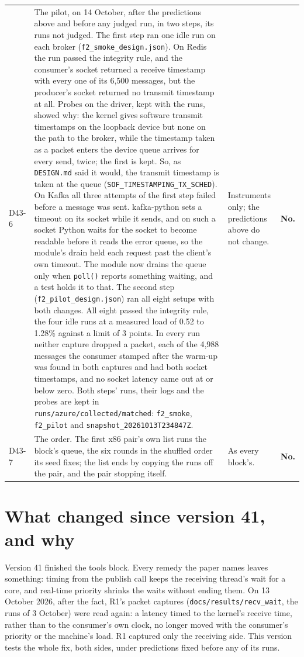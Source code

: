\documentclass[11pt]{article}
\begin{document}
{\begin{longtable}{@{}p{1.1cm} >{\raggedright\arraybackslash}p{6.1cm} >{\raggedright\arraybackslash}p{6.0cm} >{\raggedright\arraybackslash}p{2.2cm}@{}}
D43-6 & The pilot, on 14 October, after the predictions above and before any judged run, in two steps, its runs not judged. The first step ran one idle run on each broker (\texttt{f2\_smoke\_design.json}). On Redis the run passed the integrity rule, and the consumer's socket returned a receive timestamp with every one of its 6,500 messages, but the producer's socket returned no transmit timestamp at all. Probes on the driver, kept with the runs, showed why: the kernel gives software transmit timestamps on the loopback device but none on the path to the broker, while the timestamp taken as a packet enters the device queue arrives for every send, twice; the first is kept. So, as \texttt{DESIGN.md} said it would, the transmit timestamp is taken at the queue (\texttt{SOF\_TIMESTAMPING\_TX\_SCHED}). On Kafka all three attempts of the first step failed before a message was sent. kafka-python sets a timeout on its socket while it sends, and on such a socket Python waits for the socket to become readable before it reads the error queue, so the module's drain held each request past the client's own timeout. The module now drains the queue only when \texttt{poll()} reports something waiting, and a test holds it to that. The second step (\texttt{f2\_pilot\_design.json}) ran all eight setups with both changes. All eight passed the integrity rule, the four idle runs at a measured load of 0.52 to 1.28\% against a limit of 3 points. In every run neither capture dropped a packet, each of the 4,988 messages the consumer stamped after the warm-up was found in both captures and had both socket timestamps, and no socket latency came out at or below zero. Both steps' runs, their logs and the probes are kept in \texttt{runs/azure/collected/matched}: \texttt{f2\_smoke}, \texttt{f2\_pilot} and \texttt{snapshot\_20261013T234847Z}. & Instruments only; the predictions above do not change. & \textbf{No.} \\
D43-7 & The order. The first x86 pair's own list runs the block's queue, the six rounds in the shuffled order its seed fixes; the list ends by copying the runs off the pair, and the pair stopping itself. & As every block's. & \textbf{No.} \\
\bottomrule
\end{longtable}}

\section*{What changed since version 41, and why}
Version 41 finished the tools block. Every remedy the paper names leaves something: timing from
the publish call keeps the receiving thread's wait for a core, and real-time priority shrinks the
waits without ending them. On 13 October 2026, after the fact, R1's packet captures
(\texttt{docs/results/recv\_wait}, the runs of 3 October) were read again: a latency timed to the
kernel's receive time, rather than to the consumer's own clock, no longer moved with the consumer's
priority or the machine's load. R1 captured only the receiving side. This version tests the whole
fix, both sides, under predictions fixed before any of its runs.
\end{document}
